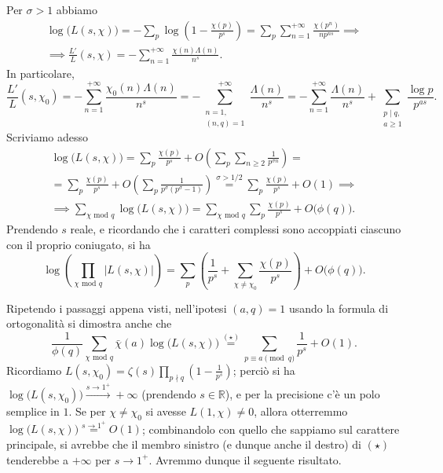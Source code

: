 \begin{oss} \label{logL}
  Per $\sigma>1$ abbiamo
  \begin{gather*}
    \log\big(L(s,\chi)\big)=-\sum_p \log\left(1-\frac{\chi(p)}{p^s}\right)=\sum_p\sum_{n=1}^{+\infty} \frac{\chi(p^n)}{np^{ns}} \implies \\
    \implies \frac{L'}{L}(s,\chi)=-\sum_{n=1}^{+\infty} \frac{\chi(n)\Lambda(n)}{n^s}.
  \end{gather*}
  In particolare,
  $$\frac{L'}{L}(s,\chi_0)=-\sum_{n=1}^{+\infty} \frac{\chi_0(n)\Lambda(n)}{n^s}=-\sum_{\substack{n=1, \\ (n,q)=1}}^{+\infty} \frac{\Lambda(n)}{n^s}=-\sum_{n=1}^{+\infty} \frac{\Lambda(n)}{n^s}+\sum_{\substack{p \mid q, \\a \ge 1}} \frac{\log{p}}{p^{as}}.$$
  Scriviamo adesso
  \begin{gather*}
    \log\big(L(s,\chi)\big)=\sum_p \frac{\chi(p)}{p^s}+O\left(\sum_p \sum_{n \ge 2} \frac{1}{p^{\sigma n}}\right)=\\
    =\sum_p \frac{\chi(p)}{p^s}+O\left(\sum_p \frac{1}{p^{\sigma}(p^{\sigma}-1)}\right)\overset{\sigma>1/2}{=}\sum_p \frac{\chi(p)}{p^s}+O(1) \implies \\
    \implies \sum_{\chi\text{ mod }q}\log\big(L(s,\chi)\big)=\sum_{\chi\text{ mod }q}\sum_p \frac{\chi(p)}{p^s}+O\big(\phi(q)\big).
  \end{gather*}
  Prendendo $s$ reale, e ricordando che i caratteri complessi sono accoppiati ciascuno con il proprio coniugato, si ha
  $$\log\left(\prod_{\chi\text{ mod }q}|L(s,\chi)|\right)=\sum_p\left(\frac{1}{p^s}+\sum_{\chi\not=\chi_0}\frac{\chi(p)}{p^s}\right)+O\big(\phi(q)\big).$$
\end{oss}

Ripetendo i passaggi appena visti, nell'ipotesi $(a,q)=1$ usando la formula di ortogonalità si dimostra anche che
$$\frac{1}{\phi(q)}\sum_{\chi\text{ mod }q} \bar{\chi}(a)\log\big(L(s,\chi)\big)\overset{(\star)}{=}\sum_{p \equiv a \pmod{q}} \frac{1}{p^s}+O(1).$$
Ricordiamo $\displaystyle L(s,\chi_0)=\zeta(s)\prod_{p\nmid q} \left(1-\frac{1}{p^s}\right)$; perciò si ha $\log\big(L(s,\chi_0)\big) \overset{s \longrightarrow 1^+}{\longrightarrow} +\infty$ (prendendo $s \in \mathbb{R}$), e per la precisione c'è un polo semplice in $1$.
Se per $\chi\not=\chi_0$ si avesse $L(1,\chi)\not=0$, allora otterremmo $\log\big(L(s,\chi)\big)\overset{s \longrightarrow 1^+}{=}O(1)$; combinandolo con quello che sappiamo sul carattere principale, si avrebbe che il membro sinistro (e dunque anche il destro) di $(\star)$ tenderebbe a $+\infty$ per $s \longrightarrow 1^+$. Avremmo dunque il seguente risultato.

